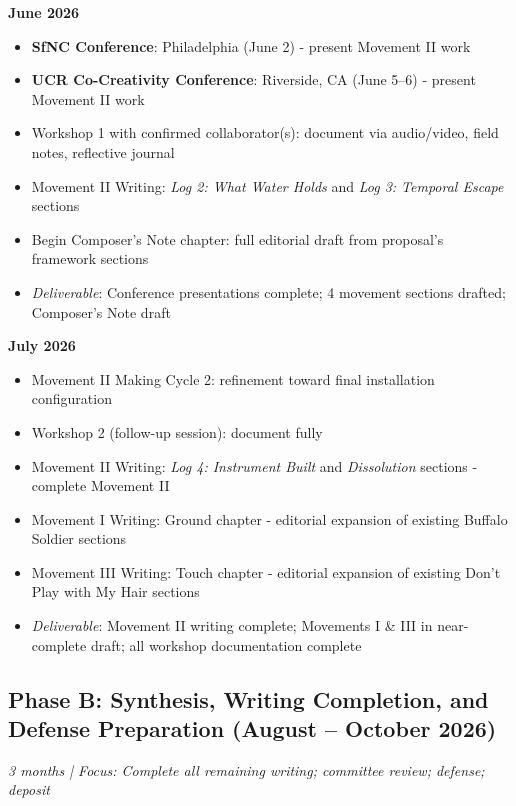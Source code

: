 \textbf{June 2026}
\begin{itemize}[noitemsep]
	\item \textbf{SfNC Conference}: Philadelphia (June 2) - present Movement II work
	\item \textbf{UCR Co-Creativity Conference}: Riverside, CA (June 5–6) - present Movement II work
	\item Workshop 1 with confirmed collaborator(s): document via audio/video, field notes, reflective journal
	\item Movement II Writing: \textit{Log 2: What Water Holds} and \textit{Log 3: Temporal Escape} sections
	\item Begin Composer's Note chapter: full editorial draft from proposal's framework sections
	\item \textit{Deliverable}: Conference presentations complete; 4 movement sections drafted; Composer's Note draft
\end{itemize}

\textbf{July 2026}
\begin{itemize}[noitemsep]
	\item Movement II Making Cycle 2: refinement toward final installation configuration
	\item Workshop 2 (follow-up session): document fully
	\item Movement II Writing: \textit{Log 4: Instrument Built} and \textit{Dissolution} sections - complete Movement II
	\item Movement I Writing: Ground chapter - editorial expansion of existing Buffalo Soldier sections
	\item Movement III Writing: Touch chapter - editorial expansion of existing Don't Play with My Hair sections
	\item \textit{Deliverable}: Movement II writing complete; Movements I \& III in near-complete draft; all workshop documentation complete
\end{itemize}

\subsection*{Phase B: Synthesis, Writing Completion, and Defense Preparation (August – October 2026)}
\textit{3 months | Focus: Complete all remaining writing; committee review; defense; deposit}

